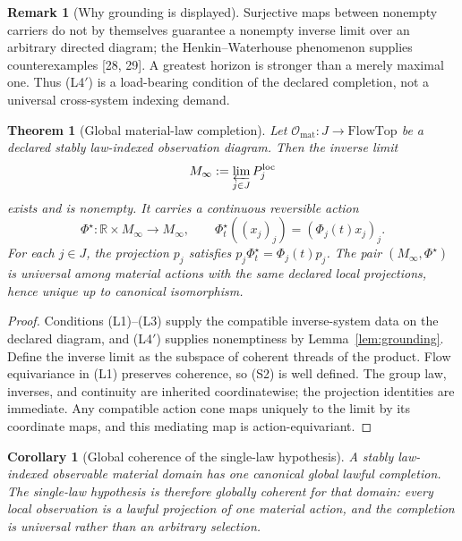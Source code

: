\documentclass[11pt]{article}
\newtheorem{theorem}{Theorem}
\newtheorem{corollary}{Corollary}
\theoremstyle{definition}
\newtheorem{remark}{Remark}
\newcommand{\Omat}{\mathcal{O}_{\mathrm{mat}}}
\newcommand{\Minf}{M_\infty}
\begin{document}
\begin{remark}[Why grounding is displayed]
Surjective maps between nonempty carriers do not by themselves guarantee a nonempty inverse limit over an arbitrary directed diagram; the Henkin--Waterhouse phenomenon supplies counterexamples [28, 29]. A greatest horizon is stronger than a merely maximal one. Thus (L4$'$) is a load-bearing condition of the declared completion, not a universal cross-system indexing demand.
\end{remark}

\begin{theorem}[Global material-law completion]
\label{thm:global-material-completion}
Let $\Omat : J \to \mathrm{FlowTop}$ be a declared stably law-indexed observation diagram. Then the inverse limit
\[
\Minf := \varprojlim_{j \in J} P^{\mathrm{loc}}_j
\]
exists and is nonempty. It carries a continuous reversible action
\begin{equation}
\Phi^{\star} : \mathbb{R} \times \Minf \longrightarrow \Minf, \qquad \Phi^{\star}_t((x_j)_j) = (\Phi_j(t)x_j)_j. \tag{S2}
\end{equation}
For each $j \in J$, the projection $p_j$ satisfies $p_j\Phi^{\star}_t = \Phi_j(t)p_j$. The pair $(\Minf, \Phi^{\star})$ is universal among material actions with the same declared local projections, hence unique up to canonical isomorphism.
\end{theorem}

\begin{proof}
Conditions (L1)--(L3) supply the compatible inverse-system data on the declared diagram, and (L4$'$) supplies nonemptiness by Lemma~\ref{lem:grounding}. Define the inverse limit as the subspace of coherent threads of the product. Flow equivariance in (L1) preserves coherence, so (S2) is well defined. The group law, inverses, and continuity are inherited coordinatewise; the projection identities are immediate. Any compatible action cone maps uniquely to the limit by its coordinate maps, and this mediating map is action-equivariant.
\end{proof}

\begin{corollary}[Global coherence of the single-law hypothesis]
A stably law-indexed observable material domain has one canonical global lawful completion. The single-law hypothesis is therefore globally coherent for that domain: every local observation is a lawful projection of one material action, and the completion is universal rather than an arbitrary selection.
\end{corollary}
\end{document}
